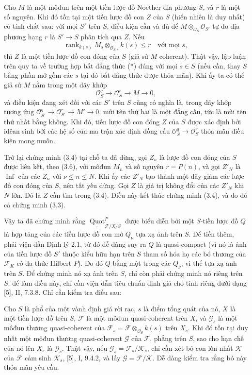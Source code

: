  Cho $M$ là một môđun trên một tiền lược đồ Noether địa
phương $S$, và $r$ là một số nguyên. Khi đó tồn tại một tiền lược đồ con $Z$
của $S$ (hiển nhiên là duy nhất) có tính chất sau: với mọi $S'$ trên $S$, điều
kiện cần và đủ để $M\otimes_{\mathcal O_S}\mathcal O_{S'}$ tự do địa phương
hạng $r$ là $S'\longrightarrow S$ phân tích qua $Z$. Nếu
\[
\operatorname{rank}_{k(s)}
M_s\otimes_{\mathcal O_{S,s}}k(s)\leq r
\quad\text{với mọi $s$},
\]
thì $Z$ là một tiền lược đồ con đóng của $S$ (giả sử $M$ coherent).
Thật vậy, lập luận trên quy ta về trường hợp bất đẳng thức (*) đúng với mọi
$s\in S$ (nếu cần, thay $S$ bằng phần mở gồm các $s$ tại đó bất đẳng thức
được thỏa mãn). Khi ấy ta có thể giả sử $M$ nằm trong một dãy khớp
\[
\mathcal O_S^q\longrightarrow\mathcal O_S^r\longrightarrow M\longrightarrow0,
\]
và điều kiện đang xét đối với các $S'$ trên $S$ cũng có nghĩa là, trong dãy
khớp tương ứng $\mathcal O_{S'}^q\longrightarrow\mathcal O_{S'}^r
\longrightarrow M'\longrightarrow0$, mũi tên thứ hai là một đẳng cấu, tức là
mũi tên thứ nhất bằng không. Khi đó, tiền lược đồ con đóng $Z$ của $S$ được
xác định bởi iđêan sinh bởi các hệ số của ma trận xác định đồng cấu
$\mathcal O_S^q\longrightarrow\mathcal O_S^r$ thỏa mãn điều kiện mong muốn.

Trở lại chứng minh (3.4) tại chỗ ta đã dừng, gọi $Z_n$ là lược đồ con đóng
của $S$ được liên kết, theo (3.6), với môđun $M_n$ và số nguyên $r=P(n)$, và
gọi $Z'_N$ là $\operatorname{Inf}$ của các $Z_n$ với
$\nu\leq n\leq N$. Khi ấy các $Z'_N$ tạo thành một dãy giảm các lược đồ con
đóng của $S$, nên tất yếu dừng. Gọi $Z$ là giá trị không đổi của các
$Z'_N$ khi $N$ lớn. Đó là $Z$ cần tìm trong (3.4). Điều này kết thúc chứng
minh (3.4), và do đó cả chứng minh (3.3).

Vậy ta đã chứng minh rằng
$\underline{\operatorname{Quot}}^P_{\mathcal F/X/S}$ được biểu diễn bởi một
$S$-tiền lược đồ $Q$ là hợp tăng của các tiền lược đồ con mở $Q_\nu$ tựa xạ
ảnh trên $S$. Để tiến thêm, phải viện dẫn Định lý 2.1, từ đó dễ dàng suy ra
$Q$ là quasi-compact (vì nó là ảnh của tiền lược đồ $S'$ thuộc kiểu hữu hạn
trên $S$ tham số hóa họ các bó thương của $\mathcal F_K$ có đa thức Hilbert
$P$). Do đó $Q$ bằng một trong các $Q_\nu$, vì thế tựa xạ ảnh trên $S$. Để
chứng minh nó xạ ảnh trên $S$, chỉ còn phải chứng minh nó riêng trên $S$; để
làm điều này, chỉ cần viện dẫn tiêu chuẩn định giá cho tính riêng dưới dạng
[5], II, 7.3.8. Chỉ cần kiểm tra điều sau:

 Cho $S$ là phổ của một vành định giá rời rạc, $s$ là điểm
tổng quát của nó, $X$ là một tiền lược đồ trên $S$, $\mathcal F$ là một môđun
quasi-coherent trên $X$, và $\mathcal G_s$ là một môđun thương quasi-coherent
của $\mathcal F_s=\mathcal F\otimes_{\mathcal O_S}k(s)$ trên $X_s$. Khi đó
tồn tại duy nhất một môđun thương quasi-coherent $\mathcal G$ của
$\mathcal F$, phẳng trên $S$, sao cho hạn chế của nó lên $X_s$ là
$\mathcal G_s$.
Thật vậy, nếu $\mathcal G_s=\mathcal F_s/\mathcal K_s$, chỉ cần xét bó con lớn
nhất $\mathcal K$ của $\mathcal F$ cảm sinh $\mathcal K_s$, [5], I, 9.4.2, và
lấy $\mathcal G=\mathcal F/\mathcal K$. Dễ dàng kiểm tra rằng bó này thỏa mãn
yêu cầu.

